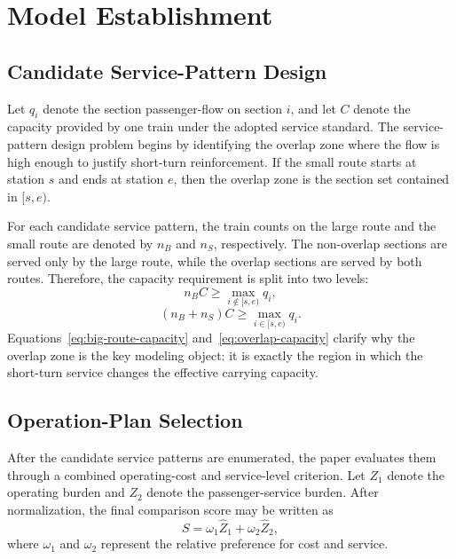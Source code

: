 \section{Model Establishment}

\subsection{Candidate Service-Pattern Design}

Let $q_i$ denote the section passenger-flow on section $i$, and let $C$ denote the capacity provided by one train under the adopted service standard. The service-pattern design problem begins by identifying the overlap zone where the flow is high enough to justify short-turn reinforcement. If the small route starts at station $s$ and ends at station $e$, then the overlap zone is the section set contained in $[s,e)$.

For each candidate service pattern, the train counts on the large route and the small route are denoted by $n_B$ and $n_S$, respectively. The non-overlap sections are served only by the large route, while the overlap sections are served by both routes. Therefore, the capacity requirement is split into two levels:
\begin{equation}
n_B C \ge \max_{i \notin [s,e)} q_i,
\label{eq:big-route-capacity}
\end{equation}
\begin{equation}
(n_B+n_S) C \ge \max_{i \in [s,e)} q_i.
\label{eq:overlap-capacity}
\end{equation}
Equations~\eqref{eq:big-route-capacity} and~\eqref{eq:overlap-capacity} clarify why the overlap zone is the key modeling object: it is exactly the region in which the short-turn service changes the effective carrying capacity.

\subsection{Operation-Plan Selection}

After the candidate service patterns are enumerated, the paper evaluates them through a combined operating-cost and service-level criterion. Let $Z_1$ denote the operating burden and $Z_2$ denote the passenger-service burden. After normalization, the final comparison score may be written as
\begin{equation}
S = \omega_1 \hat Z_1 + \omega_2 \hat Z_2,
\label{eq:route-score}
\end{equation}
where $\omega_1$ and $\omega_2$ represent the relative preference for cost and service.

